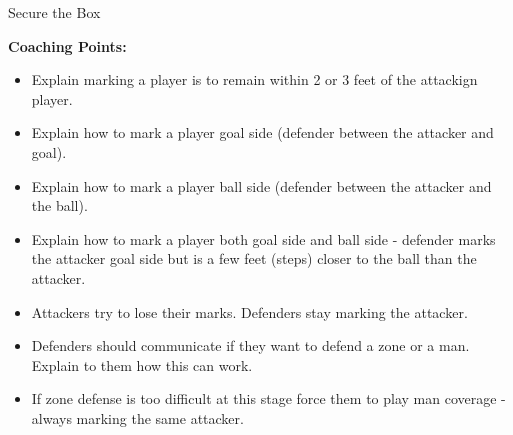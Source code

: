 \begin{evenBlock}{Secure the Box}
\begin{minipage}[t]{\linewidth}
\begin{minipage}{.6\linewidth}
        \textbf{Coaching Points:}
        \begin{itemize}
            \setlength{\itemsep}{0pt}
            \setlength{\parskip}{0pt}
            \setlength{\parsep}{0pt}
            \item Explain marking a player is to remain within 2 or 3 feet of the attackign player.
            \item Explain how to mark a player goal side (defender between the attacker and goal).
            \item Explain how to mark a player ball side (defender between the attacker and the ball).
            \item Explain how to mark a player both goal side and ball side - defender marks the attacker goal side but is a few feet (steps) closer to the ball than the attacker.
            \item Attackers try to lose their marks.  Defenders stay marking the attacker.
            \item Defenders should communicate if they want to defend a zone or a man.  Explain to them how this can work.
            \item If zone defense is too difficult at this stage force them to play man coverage - always marking the same attacker.
        \end{itemize}

    \end{minipage}
\end{minipage}

\end{evenBlock}